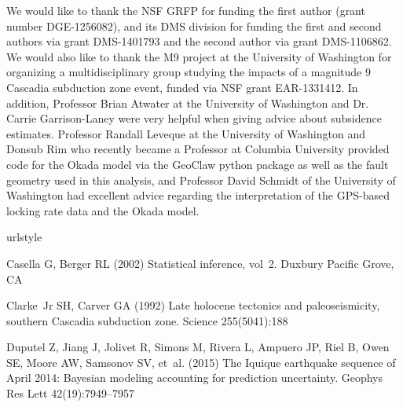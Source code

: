 {\begin{acknowledgements}
We would like to thank the NSF GRFP for funding the first author (grant number DGE-1256082), and its DMS division for funding the first and second authors via grant DMS-1401793 and the second author via grant DMS-1106862.  We would also like to thank the M9 project at the University of Washington for organizing a multidisciplinary group studying the impacts of a magnitude 9 Cascadia subduction zone event, funded via NSF grant EAR-1331412.  In addition, Professor Brian Atwater at the University of Washington and Dr. Carrie Garrison-Laney were very helpful when giving advice about subsidence estimates.  Professor Randall Leveque at the University of Washington and Donsub Rim who recently became a Professor at Columbia University provided code for the Okada model via the GeoClaw python package as well as the fault geometry used in this analysis, and Professor David Schmidt of the University of Washington had excellent advice regarding the interpretation of the GPS-based locking rate data and the Okada model.
\end{acknowledgements}

%

\begin{thebibliography}{33}
\providecommand{\natexlab}[1]{#1}
\providecommand{\url}[1]{{#1}}
\providecommand{\urlprefix}{URL }
\expandafter\ifx\csname urlstyle\endcsname\relax
  \providecommand{\doi}[1]{DOI~\discretionary{}{}{}#1}\else
  \providecommand{\doi}{DOI~\discretionary{}{}{}\begingroup
  \urlstyle{rm}\Url}\fi
\providecommand{\eprint}[2][]{\url{#2}}

Casella G, Berger RL (2002) Statistical inference, vol~2. Duxbury Pacific
  Grove, CA

Clarke~Jr SH, Carver GA (1992) Late holocene tectonics and paleoseismicity,
  southern {C}ascadia subduction zone. Science 255(5041):188

Duputel Z, Jiang J, Jolivet R, Simons M, Rivera L, Ampuero JP, Riel B, Owen SE,
  Moore AW, Samsonov SV, et~al. (2015) The {I}quique earthquake sequence of
  {A}pril 2014: {B}ayesian modeling accounting for prediction uncertainty.
  Geophys Res Lett 42(19):7949--7957


\end{thebibliography}}
